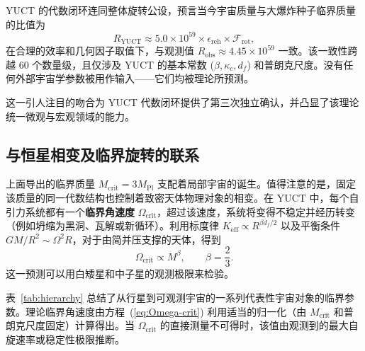 \documentclass[11pt,a4paper]{article}
\newcommand{\Keff}{K_{\mathrm{eff}}}
\begin{document}
	YUCT 的代数闭环连同整体旋转公设，预言当今宇宙质量与大爆炸种子临界质量的比值为
	\[
	R_{\mathrm{YUCT}} \approx 5.0\times 10^{59} \times \epsilon_{\mathrm{reh}} \times \mathcal{F}_{\mathrm{rot}},
	\]
	在合理的效率和几何因子取值下，与观测值 \(R_{\mathrm{obs}} \approx 4.45\times 10^{59}\) 一致。该一致性跨越 60 个数量级，且仅涉及 YUCT 的基本常数 (\(\beta, \kappa_c, d_f\)) 和普朗克尺度。没有任何外部宇宙学参数被用作输入——它们均被理论所预测。
	
	这一引人注目的吻合为 YUCT 代数闭环提供了第三次独立确认，并凸显了该理论统一微观与宏观领域的能力。
	
	\subsection{与恒星相变及临界旋转的联系}
	
	上面导出的临界质量 \(M_{\mathrm{crit}} = 3M_{\mathrm{Pl}}\) 支配着局部宇宙的诞生。值得注意的是，固定该质量的同一代数结构也控制着致密天体物理对象的相变。在 YUCT 中，每个自引力系统都有一个\textbf{临界角速度} \(\Omega_{\mathrm{crit}}\)，超过该速度，系统将变得不稳定并经历转变（例如坍缩为黑洞、瓦解或新循环）。利用标度律 \(\Keff \propto R^{\beta d_f/2}\) 以及平衡条件 \(GM/R^2 \sim \Omega^2 R\)，对于由简并压支撑的天体，得到
	\begin{equation}
		\Omega_{\mathrm{crit}} \propto M^{\beta}, \qquad \beta = \frac{2}{3}.
		\label{eq:Omega-crit}
	\end{equation}
	这一预测可以用白矮星和中子星的观测极限来检验。
	
	表~\ref{tab:hierarchy} 总结了从行星到可观测宇宙的一系列代表性宇宙对象的临界参数。理论临界角速度由方程~(\ref{eq:Omega-crit}) 利用适当的归一化（由 \(M_{\mathrm{crit}}\) 和普朗克尺度固定）计算得出。当 \(\Omega_{\mathrm{crit}}\) 的直接测量不可得时，该值由观测到的最大自旋速率或稳定性极限推断。
	
\end{document}
